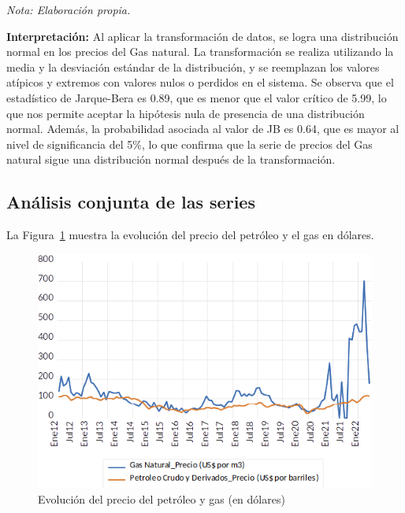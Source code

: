 \documentclass[
  letterpaper,
  DIV=11,
  numbers=noendperiod]{scrartcl}
\begin{document}
\emph{Nota: Elaboración propia.}

\textbf{Interpretación:} Al aplicar la transformación de datos, se logra
una distribución normal en los precios del Gas natural. La
transformación se realiza utilizando la media y la desviación estándar
de la distribución, y se reemplazan los valores atípicos y extremos con
valores nulos o perdidos en el sistema. Se observa que el estadístico de
Jarque-Bera es 0.89, que es menor que el valor crítico de 5.99, lo que
nos permite aceptar la hipótesis nula de presencia de una distribución
normal. Además, la probabilidad asociada al valor de JB es 0.64, que es
mayor al nivel de significancia del 5\%, lo que confirma que la serie de
precios del Gas natural sigue una distribución normal después de la
transformación.

\hypertarget{anuxe1lisis-conjunta-de-las-series}{%
\subsection{Análisis conjunta de las
series}\label{anuxe1lisis-conjunta-de-las-series}}

La Figura~\ref{fig-9} muestra la evolución del precio del petróleo y el
gas en dólares.

\begin{figure}

\caption{\label{fig-9}Evolución del precio del petróleo y gas (en
dólares)}

{\centering \includegraphics{20230603091833.png}

}

\end{figure}
\end{document}

